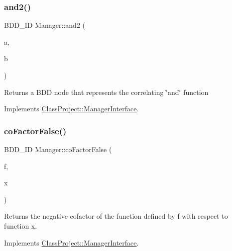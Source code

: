 \subsubsection{\texorpdfstring{and2()}{and2()}}
{\footnotesize\ttfamily B\+D\+D\+\_\+\+ID Manager\+::and2 (\begin{DoxyParamCaption}\item[{const B\+D\+D\+\_\+\+ID}]{a,  }\item[{const B\+D\+D\+\_\+\+ID}]{b }\end{DoxyParamCaption})\hspace{0.3cm}{\ttfamily [virtual]}}

\begin{DoxyReturn}{Returns}
a B\+DD node that represents the correlating \char`\"{}and\char`\"{} function 
\end{DoxyReturn}


Implements \hyperlink{classClassProject_1_1ManagerInterface_af914326d34a1ed42710f7b11e5baf010}{Class\+Project\+::\+Manager\+Interface}.

\mbox{\label{classClassProject_1_1Manager_aea635ff0e0ec0cc8b43799f2d18de598}} 
\subsubsection{\texorpdfstring{co\+Factor\+False()}{coFactorFalse()}\hspace{0.1cm}{\footnotesize\ttfamily [1/2]}}
{\footnotesize\ttfamily B\+D\+D\+\_\+\+ID Manager\+::co\+Factor\+False (\begin{DoxyParamCaption}\item[{const B\+D\+D\+\_\+\+ID}]{f,  }\item[{B\+D\+D\+\_\+\+ID}]{x }\end{DoxyParamCaption})\hspace{0.3cm}{\ttfamily [virtual]}}

\begin{DoxyReturn}{Returns}
the negative cofactor of the function defined by f with respect to function x. 
\end{DoxyReturn}


Implements \hyperlink{classClassProject_1_1ManagerInterface_ad749ef1542c5b23bbbce628d6f666fe4}{Class\+Project\+::\+Manager\+Interface}.

